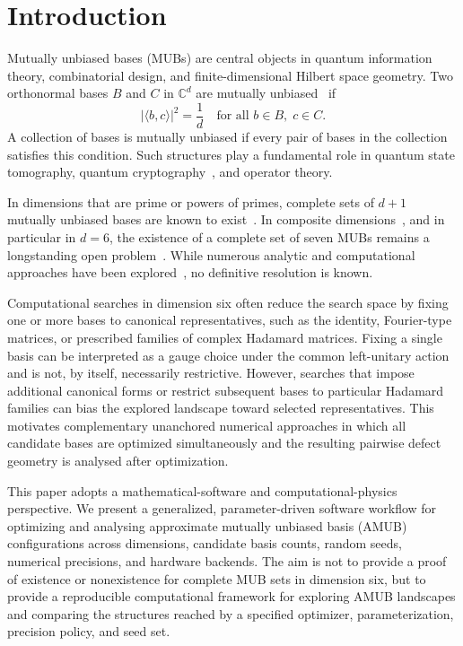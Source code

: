 \documentclass[a4paper,twocolumn,11pt,amsfonts,amssymb]{quantumarticle}
\begin{document}
\section{Introduction}

Mutually unbiased bases (MUBs) are central objects in quantum information theory, combinatorial design, and finite-dimensional Hilbert space geometry. Two orthonormal bases $B$ and $C$ in $\mathbb{C}^d$ are mutually unbiased~\cite{klappenecker2004ConstructionsMutuallyUnbiased} if
\begin{equation*}
|\langle b, c \rangle|^2 = \frac{1}{d}
\quad \text{for all } b \in B, \; c \in C.
\end{equation*}
A collection of bases is mutually unbiased if every pair of bases in the collection satisfies this condition. Such structures play a fundamental role in quantum state tomography, quantum cryptography~\cite{bennett2014QuantumCryptographyPublic}, and operator theory.

In dimensions that are prime or powers of primes, complete sets of $d+1$ mutually unbiased bases are known to exist~\cite{WOOTTERS1989optimalStateMUB}. In composite dimensions~\cite{McNulty2026mutuallyunbiased}, and in particular in $d=6$, the existence of a complete set of seven MUBs remains a longstanding open problem~\cite{bengtsson2007MUBDandHadamard, horodecki2022FiveOpenProblems}. While numerous analytic and computational approaches have been explored~\cite{brierley2010mutuallyunbiasedbasesdimensions}, no definitive resolution is known. 

Computational searches in dimension six often reduce the search space by fixing one or more bases to canonical representatives, such as the identity, Fourier-type matrices, or prescribed families of complex Hadamard matrices. Fixing a single basis can be interpreted as a gauge choice under the common left-unitary action and is not, by itself, necessarily restrictive. However, searches that impose additional canonical forms or restrict subsequent bases to particular Hadamard families can bias the explored landscape toward selected representatives. This motivates complementary unanchored numerical approaches in which all candidate bases are optimized simultaneously and the resulting pairwise defect geometry is analysed after optimization.

This paper adopts a mathematical-software and computational-physics perspective. We present a generalized, parameter-driven software workflow for optimizing and analysing approximate mutually unbiased basis (AMUB) configurations across dimensions, candidate basis counts, random seeds, numerical precisions, and hardware backends. The aim is not to provide a proof of existence or nonexistence for complete MUB sets in dimension six, but to provide a reproducible computational framework for exploring AMUB landscapes and comparing the structures reached by a specified optimizer, parameterization, precision policy, and seed set.
\end{document}
